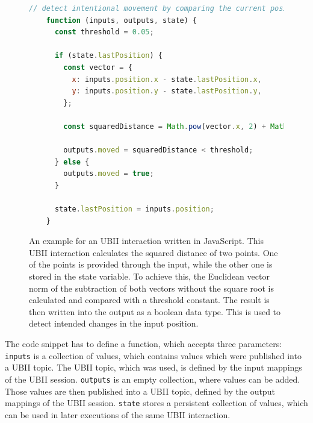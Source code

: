 \begin{figure}[H]
  \begin{lstlisting}[language=JavaScript]
    // detect intentional movement by comparing the current position with a previous one
    function (inputs, outputs, state) {
      const threshold = 0.05;

      if (state.lastPosition) {
        const vector = {
          x: inputs.position.x - state.lastPosition.x,
          y: inputs.position.y - state.lastPosition.y,
        };
  
        const squaredDistance = Math.pow(vector.x, 2) + Math.pow(vector.y, 2);
  
        outputs.moved = squaredDistance < threshold;
      } else {
        outputs.moved = true;
      }

      state.lastPosition = inputs.position;
    }
  \end{lstlisting}
  \caption[Basic UBII interaction in JavaScript]{An example for an \ac{UBII} interaction written in JavaScript. This \ac{UBII} interaction calculates the squared distance of two points. One of the points is provided through the input, while the other one is stored in the state variable. To achieve this, the Euclidean vector norm of the subtraction of both vectors without the square root is calculated and compared with a threshold constant. The result is then written into the output as a boolean data type. This is used to detect intended changes in the input position.}\label{fig:ubii-interaction-example} %
\end{figure}

The code snippet has to define a function, which accepts three parameters: 
\lstinline{inputs} is a collection of values, which contains values which were published into a \ac{UBII} topic. The \ac{UBII} topic, which was used, is defined by the input mappings of the \ac{UBII} session. \lstinline{outputs} is an empty collection, where values can be added. Those values are then published into a \ac{UBII} topic, defined by the output mappings of the \ac{UBII} session. \lstinline{state} stores a persistent collection of values, which can be used in later executions of the same \ac{UBII} interaction.